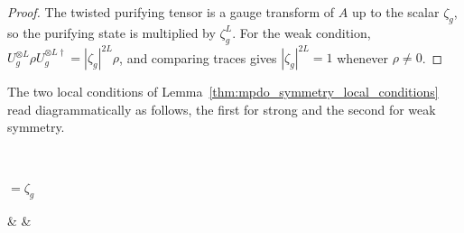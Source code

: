 \begin{proof}\leanok
    The twisted purifying tensor is a gauge transform of $A$ up to the scalar
    $\zeta_g$, so the purifying state is multiplied by $\zeta_g^L$. For the
    weak condition, $U_g^{\otimes L}\rho U_g^{\otimes L\dagger}
        =|\zeta_g|^{2L}\rho$, and comparing traces gives $|\zeta_g|^{2L}=1$
    whenever $\rho\neq 0$.
\end{proof}

The two local conditions of
Lemma~\ref{thm:mpdo_symmetry_local_conditions} read diagrammatically as
follows, the first for strong and the second for weak symmetry.
\begin{tenkzequation}
    \tenkzkernel
    \begin{tenkz}[rows={op,op}, cols=1]
         \\
    \end{tenkz}
    \quad$=\zeta_g$\quad
    \begin{tenkz}[cols=3]
         &
         &
    \end{tenkz}
    \qquad\qquad
    \begin{tenkz}[rows={op,op,op}, cols=1]
         \\

\end{tenkz}
\end{tenkzequation}
